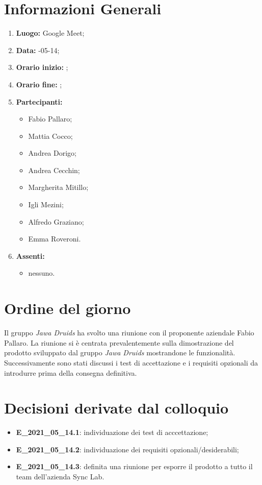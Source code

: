 \newpage
\section{Informazioni Generali}
\begin{enumerate}
	\item \textbf{Luogo:} \normalfont Google Meet;
	\item \textbf{Data:} -05-14;
	\item \textbf{Orario inizio:} ;
	\item \textbf{Orario fine:} ;
	\item \textbf{Partecipanti:}
	\begin{itemize}
		\item Fabio Pallaro;
		\item Mattia Cocco;
		\item Andrea Dorigo;
		\item Andrea Cecchin;
		\item Margherita Mitillo;
		\item Igli Mezini;
		\item Alfredo Graziano;
		\item Emma Roveroni.
	\end{itemize}
	\item \textbf{Assenti:}
	\begin{itemize}
		\item nessuno.
	\end{itemize}
\end{enumerate}
\section{Ordine del giorno}
Il gruppo \textit{Jawa Druids} ha svolto una riunione con il proponente aziendale Fabio Pallaro. La riunione si è centrata prevalentemente sulla dimostrazione del prodotto sviluppato dal gruppo \textit{Jawa Druids} mostrandone le funzionalità. Successivamente sono stati discussi i test di accettazione e i requisiti opzionali da introdurre prima della consegna definitiva.
\section{Decisioni derivate dal colloquio}
\begin{itemize}
	\item \textbf{E\_2021\_05\_14.1}: individuazione dei test di acccettazione;
	\item \textbf{E\_2021\_05\_14.2}: individuazione dei requisiti opzionali/desiderabili;
	\item \textbf{E\_2021\_05\_14.3}: definita una riunione per esporre il prodotto a tutto il team dell'azienda Sync Lab.
\end{itemize}